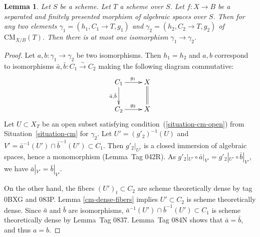 \documentclass{stacks-project}
\theoremstyle{plain}
\newtheorem{lemma}[subsection]{Lemma}
\theoremstyle{definition}
\theoremstyle{remark}
\numberwithin{equation}{subsection}
\def\CMfunctor{\mathcal{C}\!{\it oh}}
\def\CMfunctor{\text{CM}}
\begin{document}
\begin{lemma}\label{cm-fibered-in-setoids}
Let $S$ be a scheme.
Let $T$ a scheme over $S$.
Let $f \colon X \to B$ be a separated and finitely presented morphism of algebraic spaces over $S$.
Then for any two elements $\gamma_1 = (h_1,C_1 \to T,g_1)$ and $\gamma_2 = (h_2,C_2 \to T,g_2)$ of $\CMfunctor_{X/B}(T)$.
Then there is at most one isomorphism $\gamma_1 \to \gamma_2$.
\end{lemma}
\begin{proof}
Let $a,b \colon \gamma_1 \to \gamma_2$ be two isomorphisms.
Then $h_1 = h_2$ and $a,b$ correspond to isomorphisms $\bar{a},\bar{b} \colon C_1 \xrightarrow{\sim} C_2$ making the following diagram commutative:
\[ \xymatrix{
  C_1 \ar[r]^{g_1} \ar[d]_{\bar{a},\bar{b}} & X \ar@{=}[d] \\
C_2 \ar[r]^{g_2} & X
} \]
Let $U \subset X_T$ be an open subset satisfying condition~(\ref{situation-cm-open}) from Situation~\ref{situation-cm} for $\gamma_2$.
Let $U' = (g'_2)^{-1}(U)$ and $V' = \bar{a}^{-1}(U') \cap \bar{b}^{-1}(U') \subset C_1$.
Then $g'_2|_{U'}$ is a closed immersion of algebraic spaces, hence a monomorphism (Lemma~Tag 042R).
As $g'_2|_{U'} \circ \bar{a}|_{V'} = g'_2|_{U'} \circ \bar{b}|_{V'}$, we have $\bar{a}|_{V'} = \bar{b}|_{V'}$.

On the other hand, the fibers $(U')_t \subset C_2$ are scheme theoretically dense by tag 0BXG and 083P. Lemma \ref{cm-dense-fibers} implies $U' \subset C_2$ is scheme theoretically dense.
Since $\bar{a}$ and $\bar{b}$ are isomorphisms, $\bar{a}^{-1}(U') \cap \bar{b}^{-1}(U') \subset C_1$ is scheme theoretically dense by Lemma~Tag 0837.
Lemma~Tag 084N shows that $\bar{a} = \bar{b}$, and thus $a = b$.
\end{proof}
\end{document}
